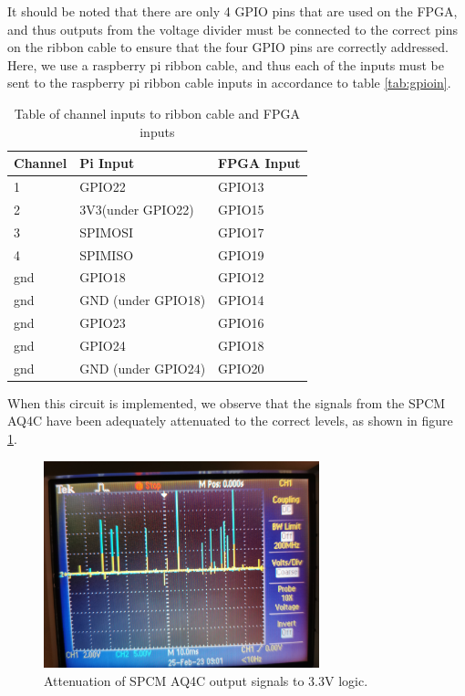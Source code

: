 \documentclass[letterpaper, 11 pt]{article}
\begin{document}
It should be noted that there are only 4 GPIO pins that are used on the FPGA, and thus outputs
from the voltage divider must be connected to the correct pins on the ribbon cable to ensure
that the four GPIO pins are correctly addressed. Here, we use
a raspberry pi ribbon cable, and thus each of the inputs must be sent to the raspberry pi ribbon cable
inputs in accordance to table \ref{tab:gpioin}.
\begin{table}[H]
    \centering
    \begin{tabular}{|l|l|l|}
    \hline
    \textbf{Channel} & \textbf{Pi Input} & \textbf{FPGA Input} \\ \hline
    1        & GPIO22 &  GPIO13                 \\ \hline
    2        & 3V3(under GPIO22) &    GPIO15              \\ \hline
    3      & SPIMOSI &        GPIO17         \\ \hline
    4      & SPIMISO &          GPIO19       \\ \hline
    gnd      & GPIO18 &          GPIO12       \\ \hline
    gnd     & GND (under GPIO18) &          GPIO14       \\ \hline
    gnd      & GPIO23 &          GPIO16       \\ \hline
    gnd      & GPIO24 &          GPIO18       \\ \hline
    gnd      & GND (under GPIO24) &          GPIO20       \\ \hline
    \end{tabular}
    \caption{Table of channel inputs to ribbon cable and FPGA inputs}
\end{table}\label{tab:gpioin}

When this circuit is implemented, we observe that the signals from the SPCM AQ4C
have been adequately attenuated to the correct levels, as shown in figure \ref{fig:signals}.
\begin{figure}[H]
    \centering
    \includegraphics[width = 8cm]{BB_attenuate.jpg}
    \caption{Attenuation of SPCM AQ4C output signals to 3.3V logic.}
    \label{fig:signals}
\end{figure}
\end{document}
